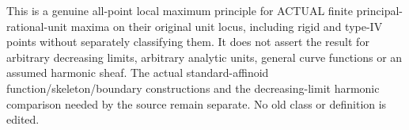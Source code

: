 \begin{remark}
This is a genuine all-point local maximum principle for ACTUAL finite
principal-rational-unit maxima on their original unit locus, including
rigid and type-IV points without separately classifying them. It does
not assert the result for arbitrary decreasing limits, arbitrary analytic
units, general curve functions or an assumed harmonic sheaf. The actual
standard-affinoid function/skeleton/boundary constructions and the
decreasing-limit harmonic comparison needed by the source remain separate.
No old class or definition is edited.
\end{remark}

